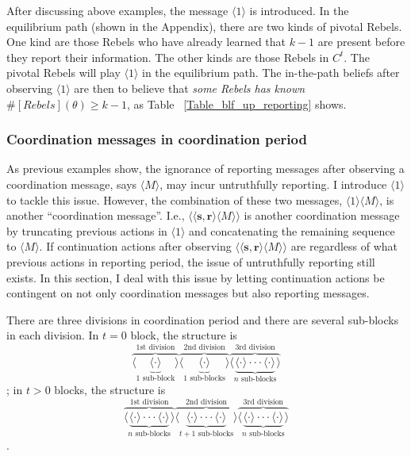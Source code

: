 \documentclass[12pt,letterpaper]{article}
\theoremstyle{definition}
\theoremstyle{remark}
\theoremstyle{claim}
\begin{document}
After discussing above examples, the message $\langle 1 \rangle$ is introduced. In the equilibrium path (shown in the Appendix), there are two kinds of pivotal Rebels. One kind are those Rebels who have already learned that $k-1$ are present before they report their information. The other kinds are those Rebels in $C^t$. The pivotal Rebels will play $\langle 1 \rangle$ in the equilibrium path. The in-the-path beliefs after observing $\langle 1 \rangle$ are then to believe that \textit{some Rebels has known $\#[Rebels](\theta)\geq k-1$}, as Table ~\ref{Table_blf_up_reporting} shows.




\subsubsection*{Coordination messages in coordination period}

As previous examples show, the ignorance of reporting messages after observing a coordination message, says $\langle M \rangle$, may incur untruthfully reporting. I introduce $\langle 1 \rangle$ to tackle this issue. However, the combination of these two messages, $\langle 1 \rangle\langle M \rangle$, is another ``coordination message''. I.e., $\langle\langle \textbf{s}, \textbf{r} \rangle\langle M \rangle\rangle$ is another coordination message by truncating previous actions in $\langle 1 \rangle$ and concatenating the remaining sequence to $\langle M \rangle$. If continuation actions after observing $\langle\langle \textbf{s}, \textbf{r} \rangle\langle M \rangle\rangle$ are regardless of what previous actions in reporting period, the issue of untruthfully reporting still exists. In this section, I deal with this issue by letting continuation actions be contingent on not only coordination messages but also  reporting messages.


There are three divisions in coordination period and there are several sub-blocks in each division. In $t=0$ block, the structure is
\[\overbrace{\langle\underbrace{\langle \cdot \rangle }_{\text{$1$ sub-block}}\rangle}^{\text{1st division}} \overbrace{\langle\underbrace{\langle \cdot \rangle }_{\text{$1$ sub-blocks}} \rangle}^{\text{2nd division}} \overbrace{\langle\underbrace{\langle \cdot \rangle \cdot \cdot \cdot \langle \cdot \rangle}_{\text{$n$ sub-blocks}}\rangle}^{\text{3rd division}}\] 
; in $t>0$ blocks, the structure is
\[\overbrace{\langle\underbrace{\langle \cdot \rangle \cdot \cdot \cdot \langle \cdot \rangle}_{\text{$n$ sub-blocks}}\rangle}^{\text{1st division}} \overbrace{\langle\underbrace{\langle \cdot \rangle \cdot \cdot \cdot \langle \cdot \rangle}_{\text{$t+1$ sub-blocks}} \rangle}^{\text{2nd division}} \overbrace{\langle\underbrace{\langle \cdot \rangle \cdot \cdot \cdot \langle \cdot \rangle}_{\text{$n$ sub-blocks}}\rangle}^{\text{3rd division}}\] 
.
\end{document}
